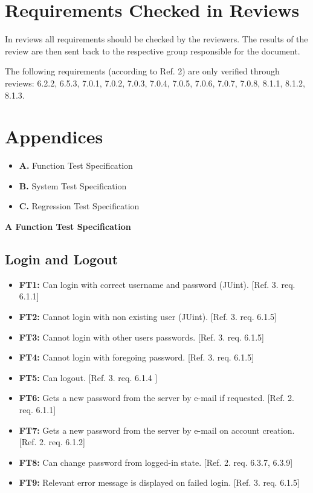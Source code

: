\documentclass{article}
\begin{document}
\section{Requirements Checked in Reviews}
In reviews all requirements should be checked by the reviewers. The results of the review are then sent back to the respective group responsible for the document.

The following requirements (according to Ref. 2) are only verified through
reviews: 6.2.2, 6.5.3, 7.0.1, 7.0.2, 7.0.3, 7.0.4, 7.0.5, 7.0.6, 7.0.7, 7.0.8, 8.1.1, 8.1.2, 8.1.3.


\section{Appendices}
	\begin{itemize}
		\item \textbf{A.} Function Test Specification 
		\item \textbf{B.} System Test Specification 	
		\item \textbf{C.} Regression Test Specification 
		\end{itemize}
	
	\newpage
		\begin{flushleft}
		{\large \textbf{A Function Test Specification}}
		\end{flushleft}
		
		\subsection{Login and Logout}
		
		\begin{itemize}
  			\item \textbf{FT1:} Can login with correct username and password (JUint). [Ref. 3. req. 6.1.1]	
			
			\item \textbf{FT2:} Cannot login with non existing user (JUint). [Ref. 3. req. 6.1.5]
			
			\item \textbf{FT3:} Cannot login with other users passwords. [Ref. 3. req. 6.1.5]
			
			\item \textbf{FT4:} Cannot login with foregoing password. [Ref. 3. req. 6.1.5]
				
			\item \textbf{FT5:} Can logout. [Ref. 3. req. 6.1.4 ]
			
  			\item \textbf{FT6:} Gets a new password from the server by e-mail if requested. [Ref. 2. req. 6.1.1]
  			\item \textbf{FT7:} Gets a new password from the server by e-mail on account creation. [Ref. 2. req. 6.1.2]
  					
  			\item \textbf{FT8:} Can change password from logged-in state. [Ref. 2. req. 6.3.7, 6.3.9]

  			\item \textbf{FT9:} Relevant error message is displayed on failed login. [Ref. 3. req. 6.1.5] 
		\end{itemize}
		
\end{document}
